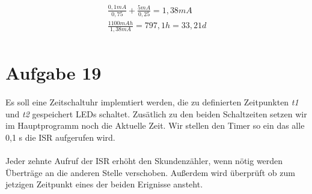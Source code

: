 \begin{eqnarray*}
	\frac{0,1 mA}{0,75} + \frac{5mA}{0,25} = 1,38 mA \\
	\frac{1100 mAh}{1,38 mA} = 797,1 h = 33,21 d \\
\end{eqnarray*}

\section*{Aufgabe 19}

\paragraph*{}
Es soll eine Zeitschaltuhr implemtiert werden, die zu definierten Zeitpunkten {\em t1} und {\em t2} gespeichert LEDs schaltet. Zusätlich zu den beiden Schaltzeiten setzen wir im Hauptprogramm noch die Aktuelle Zeit. Wir stellen den Timer so ein das alle 0,1 s die ISR aufgerufen wird.



\paragraph*{}
Jeder zehnte Aufruf der ISR erhöht den Skundenzähler, wenn nötig werden Überträge an die anderen Stelle verschoben. Außerdem wird überprüft ob zum jetzigen Zeitpunkt eines der beiden Erignisse ansteht.


